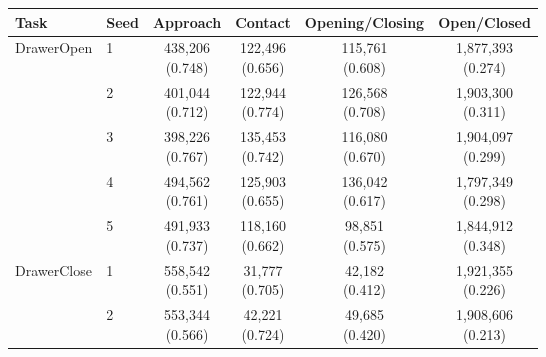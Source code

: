 \begin{table}[t]
\centering
\footnotesize
\setlength{\tabcolsep}{0.5pt}
\begin{tabular}{@{}llcccc@{}}
\toprule
Task & Seed & Approach & Contact & Opening/Closing & Open/Closed \\
\midrule
DrawerOpen & 1 & \shortstack{438,206\\(0.748)} & \shortstack{122,496\\(0.656)} & \shortstack{115,761\\(0.608)} & \shortstack{1,877,393\\(0.274)} \\
 & 2 & \shortstack{401,044\\(0.712)} & \shortstack{122,944\\(0.774)} & \shortstack{126,568\\(0.708)} & \shortstack{1,903,300\\(0.311)} \\
 & 3 & \shortstack{398,226\\(0.767)} & \shortstack{135,453\\(0.742)} & \shortstack{116,080\\(0.670)} & \shortstack{1,904,097\\(0.299)} \\
 & 4 & \shortstack{494,562\\(0.761)} & \shortstack{125,903\\(0.655)} & \shortstack{136,042\\(0.617)} & \shortstack{1,797,349\\(0.298)} \\
 & 5 & \shortstack{491,933\\(0.737)} & \shortstack{118,160\\(0.662)} & \shortstack{98,851\\(0.575)} & \shortstack{1,844,912\\(0.348)} \\
\addlinespace[1pt]
DrawerClose & 1 & \shortstack{558,542\\(0.551)} & \shortstack{31,777\\(0.705)} & \shortstack{42,182\\(0.412)} & \shortstack{1,921,355\\(0.226)} \\
 & 2 & \shortstack{553,344\\(0.566)} & \shortstack{42,221\\(0.724)} & \shortstack{49,685\\(0.420)} & \shortstack{1,908,606\\(0.213)} \\

\end{tabular}
\end{table}

